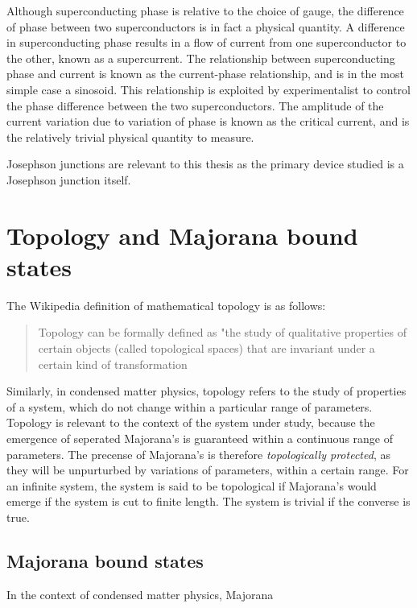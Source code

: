 			Although superconducting phase is relative to the choice of gauge, the difference of phase between two superconductors is in fact a physical quantity.
			A difference in superconducting phase results in a flow of current from one superconductor to the other, known as a supercurrent.
			The relationship between superconducting phase and current is known as the current-phase relationship, and is in the most simple case a sinosoid.
			This relationship is exploited by experimentalist to control the phase difference between the two superconductors.
			The amplitude of the current variation due to variation of phase is known as the critical current, and is the relatively trivial physical quantity to measure.
			
			Josephson junctions are relevant to this thesis as the primary device studied is a Josephson junction itself.


\section{Topology and Majorana bound states}

	The Wikipedia definition of mathematical topology is as follows:
	
	\begin{quote}Topology can be formally defined as "the study of qualitative properties of certain objects (called topological spaces) that are invariant under a certain kind of transformation
	\cite{noauthor_topology_2018}
	\end{quote}

	Similarly, in condensed matter physics, topology refers to the study of properties of a system, which do not change within a particular range of parameters.
	Topology is relevant to the context of the system under study, because the emergence of seperated Majorana's is guaranteed within a continuous range of parameters.
	The precense of Majorana's is therefore \emph{topologically protected}, as they will be unpurturbed by variations of parameters, within a certain range.
	For an infinite system, the system is said to be topological if Majorana's would emerge if the system is cut to finite length.
	The system is trivial if the converse is true.

	\subsection{Majorana bound states}
		In the context of condensed matter physics, Majorana

